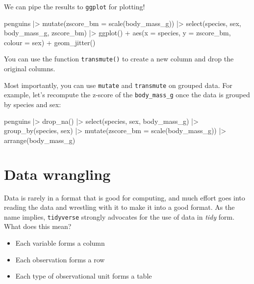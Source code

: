 \documentclass[
  letterpaper,
  DIV=11,
  numbers=noendperiod]{scrreprt}
\newenvironment{Shaded}{\begin{snugshade}}{\end{snugshade}}
\newcommand{\NormalTok}[1]{\textcolor[rgb]{0.00,0.23,0.31}{#1}}
\providecommand{\tightlist}{%
  \setlength{\itemsep}{0pt}\setlength{\parskip}{0pt}}\usepackage{longtable,booktabs,array}
\begin{document}
We can pipe the results to \texttt{ggplot} for plotting!

\begin{Shaded}
\begin{Highlighting}[]
\NormalTok{penguins |\textgreater{} }
\NormalTok{  mutate(zscore\_bm = scale(body\_mass\_g)) |\textgreater{} }
\NormalTok{  select(species, sex, body\_mass\_g, zscore\_bm) |\textgreater{} }
\NormalTok{  ggplot() + aes(x = species, y = zscore\_bm, colour = sex) + }
\NormalTok{    geom\_jitter()}
\end{Highlighting}
\end{Shaded}

You can use the function \texttt{transmute()} to create a new column and
drop the original columns.

Most importantly, you can use \texttt{mutate} and \texttt{transmute} on
grouped data. For example, let's recompute the z-score of the
\texttt{body\_mass\_g} once the data is grouped by species and sex:

\begin{Shaded}
\begin{Highlighting}[]
\NormalTok{penguins |\textgreater{} }
\NormalTok{  drop\_na() |\textgreater{} }
\NormalTok{  select(species, sex, body\_mass\_g) |\textgreater{} }
\NormalTok{  group\_by(species, sex) |\textgreater{} }
\NormalTok{  mutate(zscore\_bm = scale(body\_mass\_g)) |\textgreater{} }
\NormalTok{  arrange(body\_mass\_g)}
\end{Highlighting}
\end{Shaded}

\section{Data wrangling}\label{data-wrangling-1}

Data is rarely in a format that is good for computing, and much effort
goes into reading the data and wrestling with it to make it into a good
format. As the name implies, \texttt{tidyverse} strongly advocates for
the use of data in \emph{tidy} form. What does this mean?

\begin{itemize}
\tightlist
\item
  Each variable forms a column
\item
  Each observation forms a row
\item
  Each type of observational unit forms a table
\end{itemize}
\end{document}
